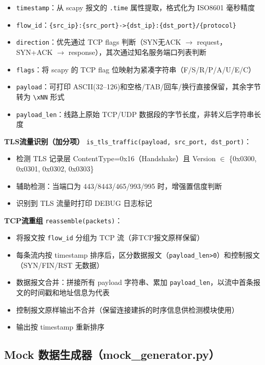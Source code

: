 \documentclass[12pt,a4paper]{ctexart}
\begin{document}
\begin{itemize}[nosep]
    \item \texttt{timestamp}：从 scapy 报文的 \texttt{.time} 属性提取，格式化为 ISO8601 毫秒精度
    \item \texttt{flow\_id}：\texttt{\{src\_ip\}:\{src\_port\}->\{dst\_ip\}:\{dst\_port\}/\{protocol\}}
    \item \texttt{direction}：优先通过 TCP flags 判断（SYN无ACK $\to$ request，SYN+ACK $\to$ response），其次通过知名服务端口列表判断
    \item \texttt{flags}：将 scapy 的 TCP flag 位映射为紧凑字符串（F/S/R/P/A/U/E/C）
    \item \texttt{payload}：可打印 ASCII(32--126)和空格/TAB/回车/换行直接保留，其余字节转为 \texttt{\textbackslash xNN} 形式
    \item \texttt{payload\_len}：线路上原始 TCP/UDP 数据段的字节长度，非转义后字符串长度
\end{itemize}

\textbf{TLS流量识别（加分项）} \texttt{is\_tls\_traffic(payload, src\_port, dst\_port)}：
\begin{itemize}[nosep]
    \item 检测 TLS 记录层 ContentType=0x16（Handshake）且 Version $\in$ \{0x0300, 0x0301, 0x0302, 0x0303\}
    \item 辅助检测：当端口为 443/8443/465/993/995 时，增强置信度判断
    \item 识别到 TLS 流量时打印 DEBUG 日志标记
\end{itemize}

\textbf{TCP流重组} \texttt{reassemble(packets)}：
\begin{itemize}[nosep]
    \item 将报文按 \texttt{flow\_id} 分组为 TCP 流（非TCP报文原样保留）
    \item 每条流内按 timestamp 排序后，区分数据报文（\texttt{payload\_len>0}）和控制报文（SYN/FIN/RST 无数据）
    \item 数据报文合并：拼接所有 payload 字符串、累加 \texttt{payload\_len}，以流中首条报文的时间戳和地址信息为代表
    \item 控制报文原样输出不合并（保留连接建拆的时序信息供检测模块使用）
    \item 输出按 timestamp 重新排序
\end{itemize}

\subsection{Mock 数据生成器（mock\_generator.py）}
\end{document}
